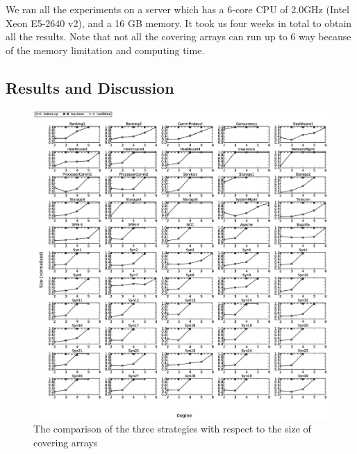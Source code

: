 \documentclass[conference]{IEEEtran}
\theoremstyle{definition}
\begin{document}
We ran all the experiments on a server which has a 6-core CPU of 2.0GHz (Intel Xeon E5-2640 v2), and a 16 GB memory. It took us four weeks in total to obtain all the results. Note that not all the covering arrays can run up to 6 way because of the memory limitation and computing time.
\subsection{Results and Discussion}
\begin{figure}[htbp]
\center
 \includegraphics[width=7.4in]{size.eps}
\caption{The comparison of the three strategies with respect to the size of covering arrays}
\label{experiement}
\end{figure}
\end{document}
